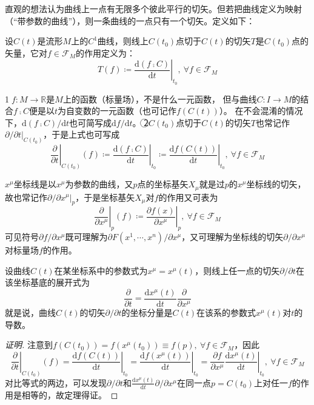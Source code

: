 直观的想法认为曲线上一点有无限多个彼此平行的切矢。但若把曲线定义为映射（``带参数的曲线''），则一条曲线的一点只有一个切矢。定义如下：

\begin{definition}
设$C(t)$是流形$M$上的$C^1$曲线，则线上$C(t_0)$点切于$C(t)$的切矢$T$是$C(t_0)$点的矢量，它对$f \in \mathscr{F}_M$的作用定义为：
$$T(f) \coloneq \left.\frac{\mathrm{d}(f \comp C)}{\mathrm{d}t}\right|_{t_0}, ~ \forall f \in \mathscr{F}_M$$
\end{definition}

\begin{note}
\textcircled{1}$f \colon M \to \mathbb{R}$是$M$上的函数（标量场），不是什么一元函数，
但与曲线$C \colon I \to M$的结合$f \comp C$便是以$t$为自变数的一元函数（也可记作$f(C(t))$）。
在不会混淆的情况下，$\mathrm{d}(f \comp C) / \mathrm{d}t$也可简写成$\mathrm{d}f / \mathrm{d}t$。
\textcircled{2}$C(t_0)$点切于$C(t)$的切矢$T$也常记作$\partial / \partial t|_{C(t_0)}$，于是上式也可写成
$$\left.\frac{\partial}{\partial t}\right|_{C(t_0)}(f) \coloneq \left.\frac{\mathrm{d}(f \comp C)}{\mathrm{d}t}\right|_{t_0} \coloneq \left.\frac{\mathrm{d}f(C(t))}{\mathrm{d}t}\right|_{t_0}, ~ \forall f \in \mathscr{F}_M$$
\end{note}

\begin{example}
$x^\mu$坐标线是以$x^\mu$为参数的曲线，又$p$点的坐标基矢$X_\mu$就是过$p$的$x^\mu$坐标线的切矢，故也常记作$\partial / \partial x^\mu|_p$，于是坐标基矢$X_\mu$对$f$的作用又可表为
$$\left.\frac{\partial}{\partial x^\mu}\right|_p(f) \coloneq \left.\frac{\partial f(x)}{\partial x^\mu}\right|_p, ~ \forall f \in \mathscr{F}_M$$
可见符号$\partial f / \partial x^\mu$既可理解为$\partial F(x^1, \cdots, x^n) / \partial x^\mu$，又可理解为坐标线的切矢$\partial / \partial x^\mu$对标量场$f$的作用。
\end{example}

\begin{theorem}
设曲线$C(t)$在某坐标系中的参数式为$x^\mu = x^\mu(t)$，则线上任一点的切矢$\partial / \partial t$在该坐标基底的展开式为
$$\frac{\partial}{\partial t} = \frac{\mathrm{d}x^\mu(t)}{\mathrm{d}t}\frac{\partial}{\partial x^\mu}$$
就是说，曲线$C(t)$的切矢$\partial / \partial t$的坐标分量是$C(t)$在该系的参数式$x^\mu(t)$对$t$的导数。
\end{theorem}

\begin{proof}[证明]
注意到$f(C(t_0)) = f(x^\mu(t_0)) \equiv f(p), ~ \forall f \in \mathscr{F}_M$，因此
$$\left.\frac{\partial}{\partial t}\right|_{C(t_0)}(f) = \left.\frac{\mathrm{d}f(C(t))}{\mathrm{d}t}\right|_{t_0}
= \left.\frac{\mathrm{d}f(x^\mu(t))}{\mathrm{d}t}\right|_{t_0} = \left.\frac{\partial f}{\partial x^\mu}\frac{\mathrm{d}x^\mu(t)}{\mathrm{d}t}\right|_{t_0}, ~ \forall f \in \mathscr{F}_M$$
对比等式的两边，可以发现$\partial / \partial t$和$\frac{\mathrm{d}x^\mu(t)}{\mathrm{d}t}\partial / \partial x^\mu$在同一点$p = C(t_0)$上对任一$f$的作用是相等的，故定理得证。
\end{proof}

